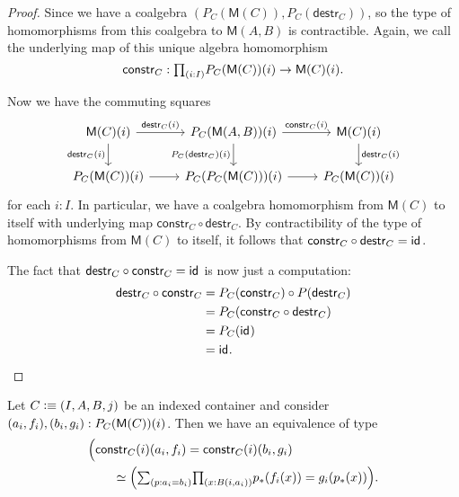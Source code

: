 \begin{proof}
Since we have a coalgebra $(P_{C}(\mathsf{M}(C)), P_{C}(\mathsf{destr}_C))$,
so the type of homomorphisms from this coalgebra to $\mathsf{M}(A,B)$ is
contractible. Again, we call the underlying map of this unique algebra homomorphism
\begin{equation*}
\mathsf{constr}_{C}:\prd{i:I} P_{C}(\mathsf{M}(C))(i)\to \mathsf{M}(C)(i).
\end{equation*} 

Now we have the commuting squares
\begin{equation*}
\begin{tikzcd}
\mathsf{M}(C)(i) \arrow[r,"\mathsf{destr}_C(i)"] \arrow[d,"\mathsf{destr}_C(i)",swap] & P_{C}(\mathsf{M}(A,B))(i) \arrow[d,swap,"P_{C}(\mathsf{destr}_C)(i)"] \arrow[r,"\mathsf{constr}_C(i)"] & \mathsf{M}(C)(i) \arrow[d,"\mathsf{destr}_C(i)"] \\
P_{C}(\mathsf{M}(C))(i) \arrow[r] & P_{C}(P_{C}(\mathsf{M}(C)))(i) \arrow[r] & P_{C}(\mathsf{M}(C))(i)
\end{tikzcd}
\end{equation*}
for each $i:I$. In particular, we have a coalgebra homomorphism from
$\mathsf{M}(C)$ to itself with underlying map $\mathsf{constr}_C\circ \mathsf{destr}_C$.
By contractibility of the type of homomorphisms from $\mathsf{M}(C)$ to itself, 
it follows that $\mathsf{constr}_C\circ \mathsf{destr}_C=\mathsf{id}_{}$. 

The fact that $\mathsf{destr}_C\circ \mathsf{constr}_C=\mathsf{id}_{}$ is now just a computation: 
\begin{align*}
\mathsf{destr}_C\circ\mathsf{constr}_C & = P_{C}(\mathsf{constr}_C)\circ P(\mathsf{destr}_C) \\
& = P_{C}(\mathsf{constr}_C\circ \mathsf{destr}_C) \\
& = P_{C}(\mathsf{id}_{}) \\
& = \mathsf{id}_{}.\qedhere
\end{align*}
\end{proof}

\begin{cor}
Let $C\vcentcolon\equiv{\mathopen{}(I,A,B,j)\mathclose{}}$ be an indexed container and consider
${\mathopen{}(a_i,f_i)\mathclose{}},{\mathopen{}(b_i,g_i)\mathclose{}}:P_C(\mathsf{M}(C))(i)$. Then we have
an equivalence of type
\begin{align*}
& \Big(\mathsf{constr}_C(i)(a_i,f_i)=\mathsf{constr}_C(i)(b_i,g_i) \\
& \qquad\eqvsym \Big(\sm{p:a_i=b_i}\prd{x:B(i,a_i)} \trans{p}{f_i(x)}=g_i(\trans{p}{x})\Big).
\end{align*}
\end{cor}

